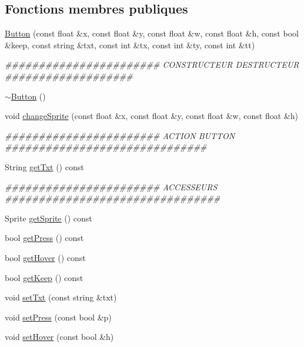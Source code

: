 \subsection*{Fonctions membres publiques}
\begin{DoxyCompactItemize}
\item 
\hyperlink{classButton_a78ef086554002d7d7c0dc41e5bf8691a}{Button} (const float \&x, const float \&y, const float \&w, const float \&h, const bool \&keep, const string \&txt, const int \&tx, const int \&ty, const int \&tt)
\begin{DoxyCompactList}\small\item\em \#\#\#\#\#\#\#\#\#\#\#\#\#\#\#\#\#\#\#\#\#\#\# CONSTRUCTEUR DESTRUCTEUR \#\#\#\#\#\#\#\#\#\#\#\#\#\#\#\#\#\#\# \end{DoxyCompactList}\item 
\hyperlink{classButton_a2a001eb9c3cc8ae54768a850dd345002}{$\sim$Button} ()
\item 
void \hyperlink{classButton_a38ef18a6af0a8df93d24a7d8e7f9e8c9}{changeSprite} (const float \&x, const float \&y, const float \&w, const float \&h)
\begin{DoxyCompactList}\small\item\em \#\#\#\#\#\#\#\#\#\#\#\#\#\#\#\#\#\#\#\#\#\#\# ACTION BUTTON \#\#\#\#\#\#\#\#\#\#\#\#\#\#\#\#\#\#\#\#\#\#\#\#\#\#\#\#\#\# \end{DoxyCompactList}\item 
String \hyperlink{classButton_a299681d75d31ebc0d439b5994b71fa1a}{getTxt} () const 
\begin{DoxyCompactList}\small\item\em \#\#\#\#\#\#\#\#\#\#\#\#\#\#\#\#\#\#\#\#\#\#\# ACCESSEURS \#\#\#\#\#\#\#\#\#\#\#\#\#\#\#\#\#\#\#\#\#\#\#\#\#\#\#\#\#\#\#\# \end{DoxyCompactList}\item 
Sprite \hyperlink{classButton_ab690e3e1554ff02232f99711a4c7b74d}{getSprite} () const 
\item 
bool \hyperlink{classButton_aac8ed7ccc0ab2007e4cd5dcfee0c68e7}{getPress} () const 
\item 
bool \hyperlink{classButton_a4f7c9d1de20e91da87e056b66350d94e}{getHover} () const 
\item 
bool \hyperlink{classButton_a2f8476a4521f3e313f016c880e3bc0f6}{getKeep} () const 
\item 
void \hyperlink{classButton_a82639fb7367f64f63487cb96a5c295b4}{setTxt} (const string \&txt)
\item 
void \hyperlink{classButton_aa87aabc37fcc961c7d987f82d57090cc}{setPress} (const bool \&p)
\item 
void \hyperlink{classButton_aa3c387302db1d339948f10fe296bfece}{setHover} (const bool \&h)
\end{DoxyCompactItemize}
